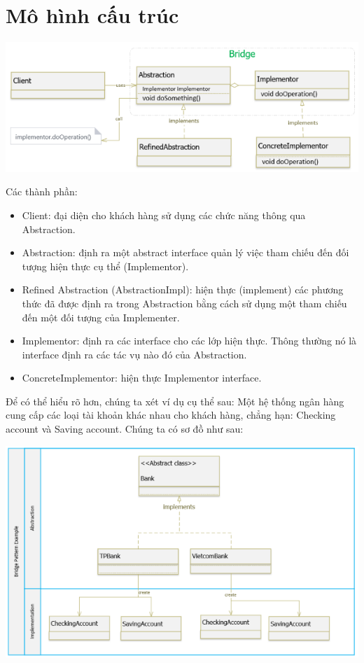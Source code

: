 \section{Mô hình cấu trúc}
\begin{center}
\includegraphics{GALLEYS/images/chapter8/diagram}
\end{center}
Các thành phần:
\begin{itemize}
\item Client: đại diện cho khách hàng sử dụng các chức năng thông qua Abstraction.
\item Abstraction: định ra một abstract interface quản lý việc tham chiếu đến đối tượng hiện thực cụ thể (Implementor).
\item Refined Abstraction (AbstractionImpl): hiện thực (implement) các phương thức đã được định ra trong Abstraction bằng cách sử dụng một tham chiếu đến một đối tượng của Implementer.
\item Implementor: định ra các interface cho các lớp hiện thực. Thông thường nó là interface định ra các tác vụ nào đó của Abstraction.
\item ConcreteImplementor: hiện thực Implementor interface.
\end{itemize}
Để có thể hiểu rõ hơn, chúng ta xét ví dụ cụ thể sau: Một hệ thống ngân hàng cung cấp các loại tài khoản khác nhau cho khách hàng, chẳng hạn: Checking account và Saving account. Chúng ta có sơ đồ như sau:
\begin{center}
\includegraphics{GALLEYS/images/chapter8/examplepic1}
\end{center}
